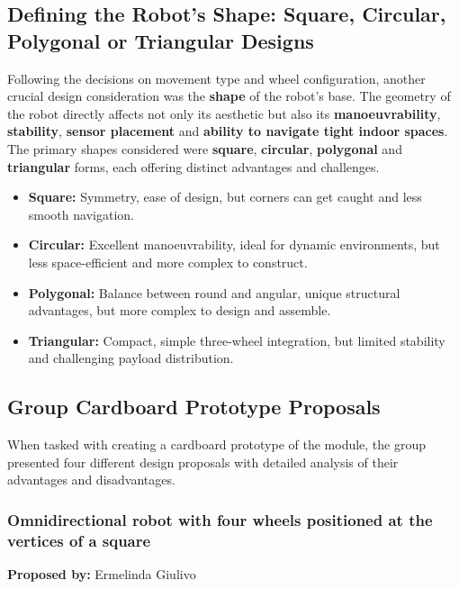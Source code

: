 \subsection{Defining the Robot’s Shape: Square, Circular, Polygonal or Triangular Designs}

Following the decisions on movement type and wheel configuration, another crucial design consideration was the \textbf{shape} of the robot's base. The geometry of the robot directly affects not only its aesthetic but also its \textbf{manoeuvrability}, \textbf{stability}, \textbf{sensor placement} and \textbf{ability to navigate tight indoor spaces}. The primary shapes considered were \textbf{square}, \textbf{circular}, \textbf{polygonal} and \textbf{triangular} forms, each offering distinct advantages and challenges.

\begin{itemize}
    \item \textbf{Square:} Symmetry, ease of design, but corners can get caught and less smooth navigation.
    \item \textbf{Circular:} Excellent manoeuvrability, ideal for dynamic environments, but less space-efficient and more complex to construct.
    \item \textbf{Polygonal:} Balance between round and angular, unique structural advantages, but more complex to design and assemble.
    \item \textbf{Triangular:} Compact, simple three-wheel integration, but limited stability and challenging payload distribution.
\end{itemize}

\subsection{Group Cardboard Prototype Proposals}

When tasked with creating a cardboard prototype of the module, the group presented four different design proposals with detailed analysis of their advantages and disadvantages.

\subsubsection{Omnidirectional robot with four wheels positioned at the vertices of a square}

\textbf{Proposed by:} Ermelinda Giulivo

